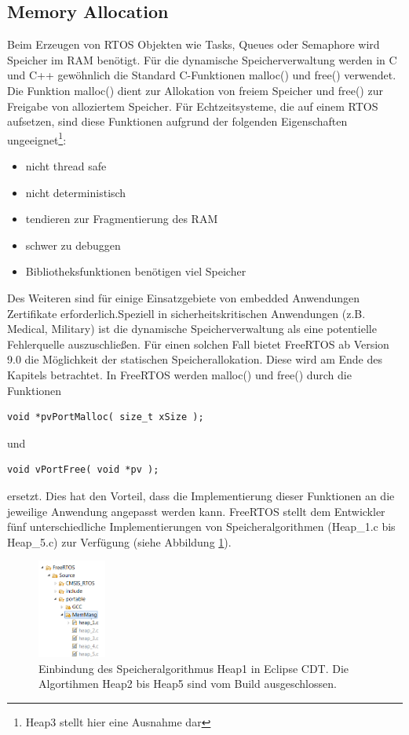 \subsection{Memory Allocation}
Beim Erzeugen von RTOS Objekten wie Tasks, Queues oder Semaphore wird Speicher im RAM benötigt. Für die dynamische Speicherverwaltung werden in C und C++ ge\-wöhnlich die Standard C-Funktionen malloc() und free() verwendet. Die Funktion malloc() dient zur Allokation von freiem Speicher und free() zur Freigabe von alloziertem Speicher. Für Echtzeitsysteme, die auf einem RTOS aufsetzen, sind diese Funktionen aufgrund der folgenden Eigenschaften\cite{MasteringFreeRtos} ungeeignet\footnote{Heap3 stellt hier eine Ausnahme dar}:
\begin{itemize}
	\item nicht thread safe
	\item nicht deterministisch
	\item tendieren zur Fragmentierung des RAM
	\item schwer zu debuggen
	\item Bibliotheksfunktionen benötigen viel Speicher
\end{itemize}
Des Weiteren sind für einige Einsatzgebiete von embedded Anwendungen Zertifikate erforderlich.\newline Speziell in sicherheitskritischen Anwendungen (z.B. Medical, Military) ist die dynamische Speicherverwaltung als eine potentielle Fehlerquelle auszuschließen. Für einen solchen Fall bietet FreeRTOS ab Version 9.0 die Möglichkeit der statischen Speicherallokation. Diese wird am Ende des Kapitels betrachtet. In FreeRTOS werden malloc() und free() durch die Funktionen  
\begin{lstlisting}[label=lst:vPortMalloc1, numbers = none]
void *pvPortMalloc( size_t xSize );
\end{lstlisting}
und
\begin{lstlisting}[label=lst:vPortFree1, numbers = none]
void vPortFree( void *pv );
\end{lstlisting}
ersetzt. Dies hat den Vorteil, dass die Implementierung dieser Funktionen an die jeweilige Anwendung angepasst werden kann. FreeRTOS stellt dem Entwickler fünf unterschiedliche Implementierungen von Speicheralgorithmen (Heap\_1.c bis Heap\_5.c) zur Verfügung (siehe Abbildung \ref{fig:HeapsEclipse}). 
\begin{figure}[htb]
	\centering
		\includegraphics[width=0.2\textwidth]{Pictures/Eclipse/Heaps.png}
	\caption{Einbindung des Speicheralgorithmus Heap1 in Eclipse CDT. Die Algortihmen Heap2 bis Heap5 sind vom Build ausgeschlossen.}
	\label{fig:HeapsEclipse}
\end{figure}

